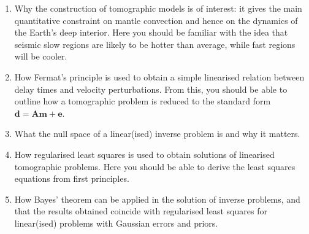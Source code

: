 \documentclass[14pt]{beamer}
\begin{document}
\begin{frame}[t]
\begin{enumerate}
\item[(i)] Why the construction of tomographic models is of interest: it gives the main quantitative constraint on
mantle convection and hence on the dynamics of the Earth's deep interior. Here you should be familiar with the idea
that seismic slow regions are likely to be hotter than average, while fast regions will be cooler.
\item[(ii)] How Fermat's principle is used to obtain a simple linearised relation between delay times and velocity
perturbations. From this, you should be able to outline how a tomographic problem is reduced to the standard form
$\mathbf{d} = \mathbf{A}\mathbf{m} + \mathbf{e}$.
\item[(iii)] What the null space of a linear(ised) inverse problem is and why it matters.
\item[(iv)] How regularised least squares is used to obtain solutions of linearised tomographic problems. Here you
should be able to derive the least squares equations from first principles.
\item[(v)] How Bayes' theorem can be applied in the solution of inverse problems, and that the results obtained
coincide with regularised least squares for linear(ised) problems with Gaussian errors and priors.
\end{enumerate}
\end{frame}
\end{document}

